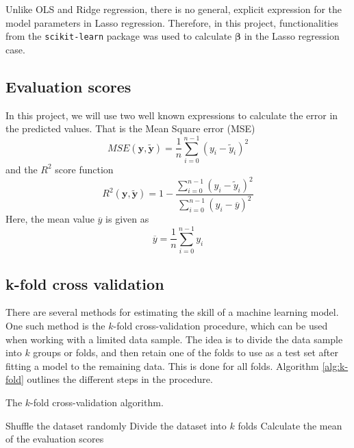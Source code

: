 Unlike OLS and Ridge regression, there is no general, explicit expression for the model parameters in Lasso regression. Therefore, in this project, functionalities from the \texttt{scikit-learn} package was used to calculate $\boldsymbol{\beta}$  in the Lasso regression case.  

\subsection{Evaluation scores}
In this project, we will use two well known expressions to calculate the error in the predicted values. That is the Mean Square error (MSE)
\begin{equation}\label{eq:mse}
	MSE(\boldsymbol{y},\boldsymbol{\tilde{y}}) = \frac{1}{n} \sum_{i=0}^{n-1}\left(y_i-\tilde{y}_i\right)^2
\end{equation}
and the $R^2$ score function
\begin{equation*}
	R^2(\boldsymbol{y},\boldsymbol{\tilde{y}}) = 1- \frac{\sum_{i=0}^{n-1}\left(y_i-\tilde{y}_i\right)^2}{\sum_{i=0}^{n-1}\left(y_i-\overline{y}\right)^2}
\end{equation*}
Here, the mean value $\overline{y}$ is given as
\begin{equation*}
	\overline{y}=\frac{1}{n}\sum_{i=0}^{n-1}y_i
\end{equation*}

\subsection{k-fold cross validation}
There are several methods for estimating the skill of a machine learning model. One such method is the $k$-fold cross-validation procedure, which can be used when working with a limited data sample. The idea is to divide the data sample into $k$ groups or folds, and then retain one of the folds to use as a test set after fitting a model to the remaining data. This is done for all folds. Algorithm \ref{alg:k-fold} outlines the different steps in the procedure. 

\begin{algorithm}[htbp]\caption{The $k$-fold cross-validation algorithm.}\label{alg:k-fold}
	\SetAlgoLined
	\BlankLine
	\BlankLine
	Shuffle the dataset randomly\;
	Divide the dataset into $k$ folds\;
	Calculate the mean of the evaluation scores\;	
	\BlankLine
	\BlankLine
\end{algorithm}


